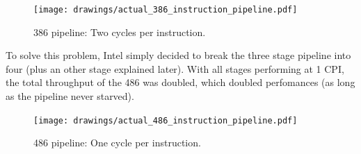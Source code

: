 \begin{figure}[H]
\centering
\texttt{[image: drawings/actual\_386\_instruction\_pipeline.pdf]}
\caption{386 pipeline: Two cycles per instruction.}

\end{figure}

\par
To solve this problem, Intel simply decided to break the three stage pipeline into four (plus an other stage explained later). With all stages performing at 1 CPI, the total throughput of the 486 was doubled, which doubled perfomances (as long as the pipeline never starved).\\
\begin{figure}[H]
\centering
\texttt{[image: drawings/actual\_486\_instruction\_pipeline.pdf]}
\caption{486 pipeline: One cycle per instruction.}
\end{figure}
\par





